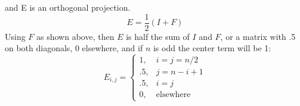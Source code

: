 \documentclass{article} %
\begin{document}
and E is an orthogonal projection.  
\begin{equation}
E = \frac{1}{2}(I + F)
\end{equation}
Using $F$ as shown above, then $E$ is half the sum of $I$ and $F$, or a matrix with .5 on both diagonals, 0 elsewhere, and if $n$ is odd the center term will be 1:
\begin{equation}
E_{i, j} = \left\{\begin{array}{cl}1,& i=j=n/2 \\
			.5,& j = n - i + 1 \\
			.5,& i = j \\
			0,& \mbox{elsewhere}\end{array}\right.
\end{equation}
\\
\\
\end{document}
